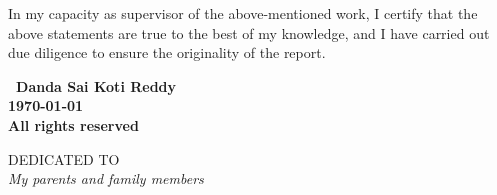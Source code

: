 \documentclass[oneside,12pt]{./thesisStyle/IIScthesisPSnPDF}
\newcommand{\blankpage}{
\newpage
\thispagestyle{empty}
\mbox{}
\newpage
}
\begin{document}
  \qquad
 
 \vspace{20mm}
 
 \noindent In my capacity as supervisor of the above-mentioned work, I certify
 that the above statements are true to the best of my knowledge, and 
 I have carried out due diligence to ensure the originality of the
 report.
 
 \vspace{20mm}
 
  \qquad
		
\blankpage

\vspace*{\fill}
\begin{center}
\large\bf \textcopyright \ Danda Sai Koti Reddy\\
\large\bf \monthyeardate\today\\
\large\bf All rights reserved
\end{center}
\vspace*{\fill}
\thispagestyle{empty}

\blankpage

\vspace*{\fill}
\begin{center}
DEDICATED TO \\[2em]
\Large\it My parents and family members%
\end{center}
\vspace*{\fill}
\thispagestyle{empty}

%
\end{document}
